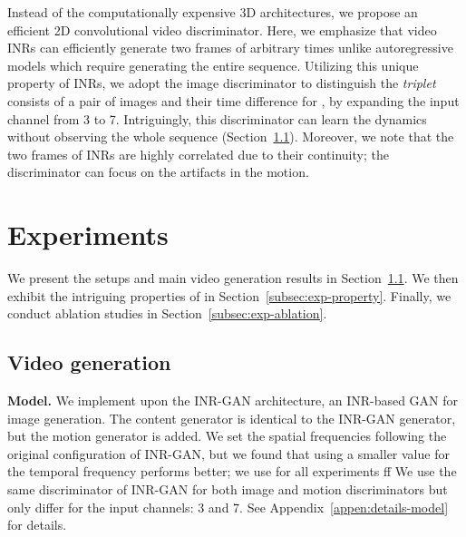 \documentclass{article} \usepackage{iclr2022_conference,times}
\begin{document}
Instead of the computationally expensive 3D architectures, we propose an efficient 2D convolutional
video discriminator. Here, we emphasize that video INRs can efficiently generate two frames of arbitrary times  unlike autoregressive models which require generating the entire sequence. Utilizing this unique property of INRs, we adopt the image discriminator to distinguish the \emph{triplet} consists of a pair of images and their time difference  for , by expanding the input channel from 3 to 7. Intriguingly, this discriminator can learn the dynamics without observing the whole sequence (Section~\ref{subsec:exp-main}). 
Moreover, we note that the two frames of INRs are highly correlated due to their continuity; the discriminator can focus on the artifacts in the motion.

\section{Experiments}
\label{sec:exp}

We present the setups and main video generation results in Section~\ref{subsec:exp-main}. We then exhibit the intriguing properties of \sname in Section~\ref{subsec:exp-property}. Finally, we conduct ablation studies in Section~\ref{subsec:exp-ablation}.

\subsection{Video generation}
\label{subsec:exp-main}

\textbf{Model.}
We implement \sname upon the INR-GAN \citep{skorokhodov2021adversarial} architecture, an INR-based GAN for image generation. The content generator  is identical to the INR-GAN generator, but the motion generator  is added. We set the spatial frequencies  following the original configuration of INR-GAN, but we found that using a smaller value for the temporal frequency  performs better; we use  for all experiments ff We use the same discriminator of INR-GAN for both image and motion discriminators but only differ for the input channels: 3 and 7. See Appendix~\ref{appen:details-model} for details.
\end{document}
